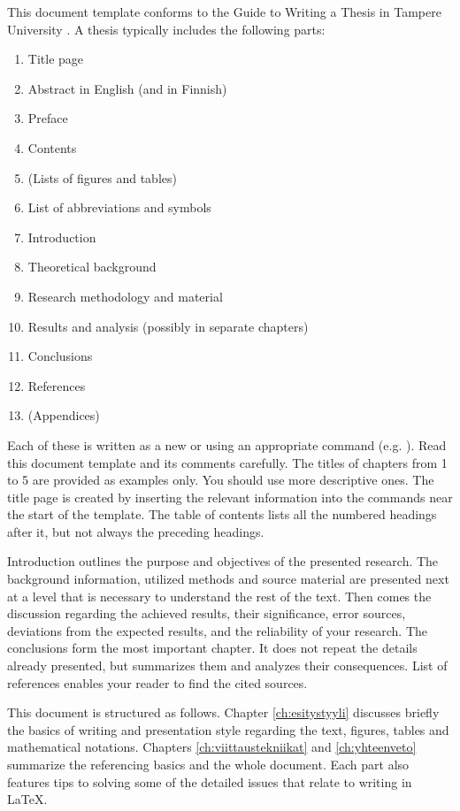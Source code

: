 This document template conforms to the Guide to Writing a Thesis in Tampere University \parencite{thesisguide2018}. A thesis typically includes the following parts:

\begin{enumerate}
    \item[] Title page
    \item[] Abstract in English (and in Finnish)
    \item[] Preface
    \item[] Contents
    \item[] (Lists of figures and tables)
    \item[] List of abbreviations and symbols
    \item Introduction
    \item Theoretical background
    \item Research methodology and material
    \item Results and analysis (possibly in separate chapters)
    \item Conclusions
    \item[] References
    \item[] (Appendices)
\end{enumerate}

Each of these is written as a new  or using an appropriate command (e.g. ). Read this document template and its comments carefully. The titles of chapters from 1 to 5 are provided as examples only. You should use more descriptive ones. The title page is created by inserting the relevant information into the commands near the start of the template. The table of contents lists all the numbered headings after it, but not always the preceding headings.

Introduction outlines the purpose and objectives of the presented research. The background information, utilized methods and source material are presented next at a level that is necessary to understand the rest of the text. Then comes the discussion regarding the achieved results, their significance, error sources, deviations from the expected results, and the reliability of your research. The conclusions form the most important chapter. It does not repeat the details already presented, but summarizes them and analyzes their consequences. List of references enables your reader to find the cited sources.

This document is structured as follows. Chapter \ref{ch:esitystyyli} discusses briefly the basics of writing and presentation style regarding the text, figures, tables and mathematical notations. Chapters \ref{ch:viittaustekniikat} and \ref{ch:yhteenveto} summarize the referencing basics and the whole document. Each part also features tips to solving some of the detailed issues that relate to writing in \LaTeX.